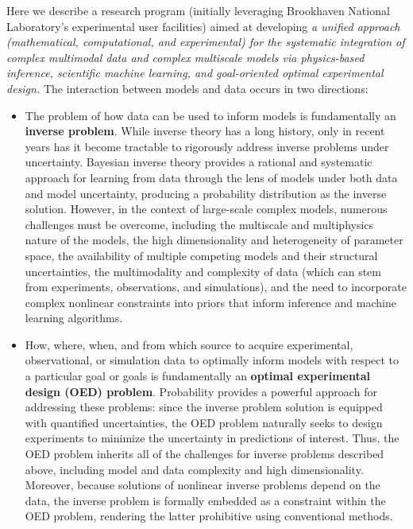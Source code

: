 \documentclass[11pt]{article}
\newcommand{\zapspace}{\topsep=0pt\partopsep=0pt\itemsep=0pt\parskip=0pt}
\begin{document}
Here we describe a research program (initially leveraging Brookhaven
National Laboratory's experimental user facilities) aimed at
developing {\em a unified approach (mathematical, computational, and
  experimental) for the systematic integration of complex multimodal
  data and complex multiscale models via physics-based inference,
  scientific machine learning, and goal-oriented optimal experimental
  design.}  The interaction between models and data occurs in two
directions:
 \vspace{-0.15cm}
 \begin{itemize}%
 \zapspace
 \item The problem of how data can be used to inform models is
   fundamentally an {\bf inverse problem}. While inverse theory has a
   long history, only in recent years has it become tractable to
   rigorously address inverse problems under uncertainty. Bayesian
   inverse theory provides a rational and systematic approach for
   learning from data through the lens of models under both data and
   model uncertainty, producing a probability distribution as the
   inverse solution.  However, in the context of large-scale complex
   models, numerous challenges must be overcome, including the
   multiscale and multiphysics nature of the models, the high
   dimensionality and heterogeneity of parameter space, the
   availability of multiple competing models and their structural
   uncertainties, the multimodality and complexity of data (which can
   stem from experiments, observations, and simulations), and the need
   to incorporate complex nonlinear constraints into priors that
   inform inference and machine learning algorithms.

\item How, where, when, and from which source to acquire experimental,
  observational, or simulation data to optimally inform models with
  respect to a particular goal or goals is fundamentally an {\bf
    optimal experimental design (OED) problem}. Probability provides a
  powerful approach for addressing these problems: since the inverse
  problem solution is equipped with quantified uncertainties, the OED
  problem naturally seeks to design experiments to minimize the
  uncertainty in predictions of interest.  Thus, the OED problem
  inherits all of the challenges for inverse problems described above,
  including model and data complexity and high
  dimensionality. Moreover, because solutions of nonlinear inverse
  problems depend on the data, the inverse problem is formally
  embedded as a constraint within the OED problem, rendering the
  latter prohibitive using conventional methods.

\end{itemize}
\end{document}
